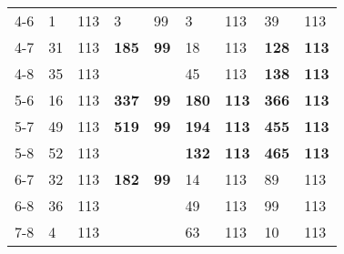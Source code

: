 \begin{table}[ht]
\begin{tabular}{rllllllll}
  4-6 & 1 & 113 & 3 & 99 & 3 & 113 & 39 & 113 \\ 
  4-7 & 31 & 113 & \textbf{185} & \textbf{99} & 18 & 113 & \textbf{128} & \textbf{113} \\ 
  4-8 & 35 & 113 &  &  & 45 & 113 & \textbf{138} & \textbf{113} \\ 
  5-6 & 16 & 113 & \textbf{337} & \textbf{99} & \textbf{180} & \textbf{113} & \textbf{366} & \textbf{113} \\ 
  5-7 & 49 & 113 & \textbf{519} & \textbf{99} & \textbf{194} & \textbf{113} & \textbf{455} & \textbf{113} \\ 
  5-8 & 52 & 113 &  &  & \textbf{132} & \textbf{113} & \textbf{465} & \textbf{113} \\ 
  6-7 & 32 & 113 & \textbf{182} & \textbf{99} & 14 & 113 & 89 & 113 \\ 
  6-8 & 36 & 113 &  &  & 49 & 113 & 99 & 113 \\ 
  7-8 & 4 & 113 &  &  & 63 & 113 & 10 & 113 \\ 
   \bottomrule
\end{tabular}
\end{table}
